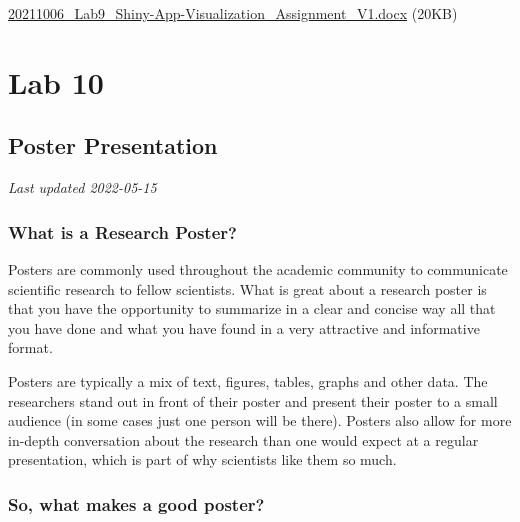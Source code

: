 \documentclass[
]{book}
\begin{document}
\href{files/20211006_Lab9_Shiny-App-Visualization_Assignment_V1.docx}{20211006\_Lab9\_Shiny-App-Visualization\_Assignment\_V1.docx} (20KB)

\hypertarget{part-lab-10}{%
\part*{Lab 10}\label{part-lab-10}}

\hypertarget{poster-presentation}{%
\chapter*{Poster Presentation}\label{poster-presentation}}

\emph{Last updated 2022-05-15}

\hypertarget{what-is-a-research-poster}{%
\section*{What is a Research Poster?}\label{what-is-a-research-poster}}

Posters are commonly used throughout the academic community to communicate scientific research to fellow scientists. What is great about a research poster is that you have the opportunity to summarize in a clear and concise way all that you have done and what you have found in a very attractive and informative format.

Posters are typically a mix of text, figures, tables, graphs and other data. The researchers stand out in front of their poster and present their poster to a small audience (in some cases just one person will be there). Posters also allow for more in-depth conversation about the research than one would expect at a regular presentation, which is part of why scientists like them so much.

\hypertarget{so-what-makes-a-good-poster}{%
\section*{So, what makes a good poster?}\label{so-what-makes-a-good-poster}}
\end{document}
